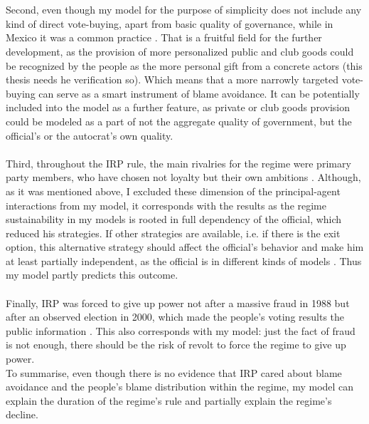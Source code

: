 \documentclass[a4paper, 12pt]{article}
\begin{document}
	\\\\
	Second, even though my model for the purpose of simplicity does not include any kind of direct vote-buying, apart from basic quality of governance, while in Mexico it was a common practice \parencite{vote_buy}. That is a fruitful field for the further development, as the provision of more personalized public and club goods could be recognized by the people as the more personal gift from a concrete actors (this thesis needs he verification so). Which means that a more narrowly targeted vote-buying can serve as a smart instrument of blame avoidance. It can be potentially included into the model as a further feature, as private or club goods provision could be modeled as a part of not the aggregate quality of government, but the official's or the autocrat's own quality.
	\\\\
	Third, throughout the IRP rule, the main rivalries for the regime were primary party members, who have chosen not loyalty but their own ambitions \parencite{members}. Although, as it was mentioned above, I excluded these dimension of the principal-agent interactions from my model, it corresponds with the results as the regime sustainability in my models is rooted in full dependency of the official, which reduced his strategies. If other strategies are available, i.e. if there is the exit option, this alternative strategy should affect the official's behavior and make him at least partially independent, as the official is in different kinds of models \parencite{loyal_competent_1}. Thus my model partly predicts this outcome.
	\\\\
	Finally, IRP was forced to give up power not after a massive fraud in 1988 but after an observed election in 2000, which made the people's voting results the public information \parencite{fraud}. This also corresponds with my model: just the fact of fraud is not enough, there should be the risk of revolt to force the regime to give up power.\\
	To summarise, even though there is no evidence that IRP cared about blame avoidance and the people's blame distribution within the regime, my model can explain the duration of the regime's rule and partially explain the regime's decline.
	
\end{document}
